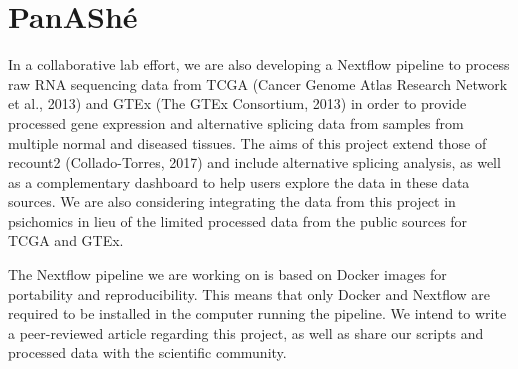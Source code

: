 \chapter{PanAShé}

In a collaborative lab effort, we are also developing a Nextflow pipeline to process raw RNA sequencing data from TCGA (Cancer Genome Atlas Research Network et al., 2013) and GTEx (The GTEx Consortium, 2013) in order to provide processed gene expression and alternative splicing data from samples from multiple normal and diseased tissues. The aims of this project extend those of recount2 (Collado-Torres, 2017) and include alternative splicing analysis, as well as a complementary dashboard to help users explore the data in these data sources. We are also considering integrating the data from this project in psichomics in lieu of the limited processed data from the public sources for TCGA and GTEx.

The Nextflow pipeline we are working on is based on Docker images for portability and reproducibility. This means that only Docker and Nextflow are required to be installed in the computer running the pipeline. We intend to write a peer-reviewed article regarding this project, as well as share our scripts and processed data with the scientific community.